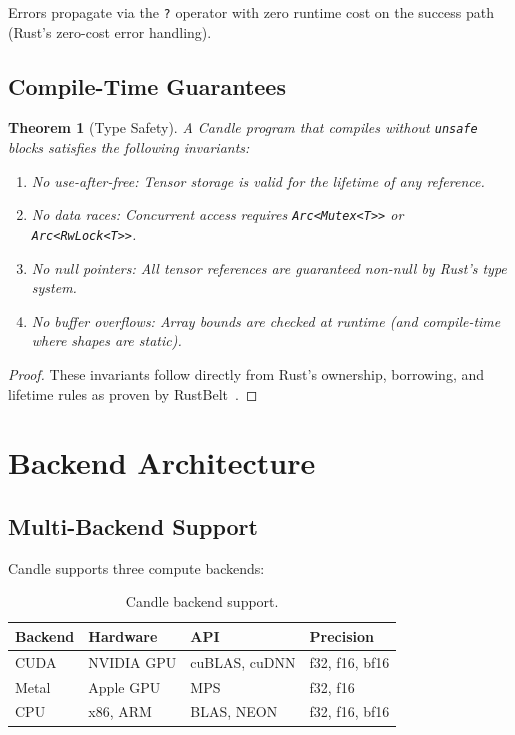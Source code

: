 \documentclass[11pt,twocolumn]{article}
\newtheorem{theorem}{Theorem}
\begin{document}
Errors propagate via the \texttt{?} operator with zero runtime cost on the success path (Rust's zero-cost error handling).

\subsection{Compile-Time Guarantees}

\begin{theorem}[Type Safety]
A Candle program that compiles without \texttt{unsafe} blocks satisfies the following invariants:
\begin{enumerate}[leftmargin=1.4em]
    \item No use-after-free: Tensor storage is valid for the lifetime of any reference.
    \item No data races: Concurrent access requires \texttt{Arc<Mutex<T>>} or \texttt{Arc<RwLock<T>>}.
    \item No null pointers: All tensor references are guaranteed non-null by Rust's type system.
    \item No buffer overflows: Array bounds are checked at runtime (and compile-time where shapes are static).
\end{enumerate}
\end{theorem}

\begin{proof}
These invariants follow directly from Rust's ownership, borrowing, and lifetime rules as proven by RustBelt~\cite{jung2018rustbelt}.
\end{proof}

\section{Backend Architecture}
\label{sec:backends}

\subsection{Multi-Backend Support}

Candle supports three compute backends:

\begin{table}[H]
\centering
\small
\begin{tabular}{llll}
\toprule
\textbf{Backend} & \textbf{Hardware} & \textbf{API} & \textbf{Precision} \\
\midrule
CUDA & NVIDIA GPU & cuBLAS, cuDNN & f32, f16, bf16 \\
Metal & Apple GPU & MPS & f32, f16 \\
CPU & x86, ARM & BLAS, NEON & f32, f16, bf16 \\
\bottomrule
\end{tabular}
\caption{Candle backend support.}
\label{tab:backends}
\end{table}
\end{document}
